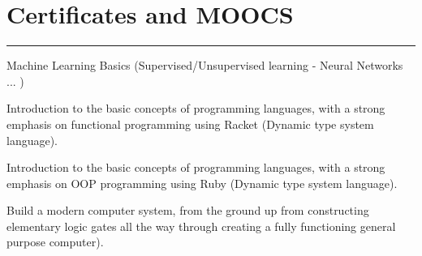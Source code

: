 \documentclass[]{rahulworld-resume}
\begin{document}
\begin{minipage}[t]{0.66\textwidth}
\section{Certificates and MOOCS}
\noindent\rule{12.5cm}{0.4pt}
 
\noindent
\hspace{5em}%
\begin{minipage}{0.85\textwidth\vspace{2pt}}
Machine Learning Basics (Supervised/Unsupervised learning - Neural Networks ... ) 
\end{minipage}
 
\noindent
\hspace{5em}%
\begin{minipage}{0.85\textwidth\vspace{2pt}}
Introduction to the basic concepts of programming languages, with a strong emphasis on functional programming using Racket (Dynamic type system language).
\end{minipage}
 
\noindent
\hspace{5em}%
\begin{minipage}{0.85\textwidth\vspace{2pt}}Introduction to the basic concepts of programming languages, with a strong emphasis on OOP programming using Ruby (Dynamic type system language).
\end{minipage}

 
\noindent
\hspace{5em}%
\begin{minipage}{0.85\textwidth\vspace{12pt}}Build a modern computer system, from the ground up from constructing elementary logic gates all the way through creating a fully functioning general purpose computer).
\end{minipage}


\hspace{5em}%
\vspace{12pt}



\end{minipage} 
\end{document}
